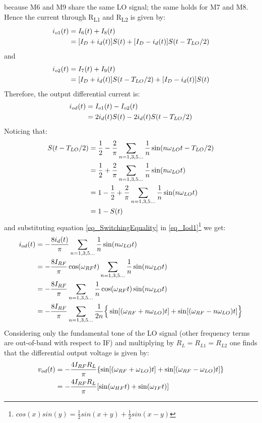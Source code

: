 because M6 and M9 share the same LO signal; the same holds for M7 and M8. 
Hence the current through R\textsubscript{L1} and R\textsubscript{L2} is given by:
\begin{align}
i_{o1}(t) &= I_6(t)+I_8(t) \notag \\
&=[I_D + i_d(t)]S(t)+[I_D - i_d(t)]S(t-T_{LO}/2) 
\end{align}
and 
\begin{align}
i_{o2}(t) &= I_7(t)+I_9(t) \notag \\
&=[I_D + i_d(t)]S(t-T_{LO}/2)+[I_D - i_d(t)]S(t) 
\end{align}
Therefore, the output differential current is:
\begin{align}
\label{eq_Iod1}
i_{od}(t) &= I_{o1}(t)-I_{o2}(t) \notag \\
&=2i_d(t) S(t)-2i_d(t)S(t-T_{LO}/2) 
\end{align}
Noticing that:
\begin{align}
\label{eq_SwitchingEquality}
S(t-T_{LO}/2) &=\frac{1}{2}-\frac{2}{\pi} \sum_{n=1,3,5 \dots}^{} \frac{1}{n}\sin(n\omega_{LO} t-T_{LO}/2) \notag \\
&= \frac{1}{2}+\frac{2}{\pi} \sum_{n=1,3,5 \dots}^{} \frac{1}{n}\sin(n\omega_{LO} t) \notag \\
& =1- \frac{1}{2}+\frac{2}{\pi} \sum_{n=1,3,5 \dots}^{} \frac{1}{n}\sin(n\omega_{LO} t) \notag \\
&= 1 - S(t)
\end{align}
and substituting equation \ref{eq_SwitchingEquality} in \ref{eq_Iod1}\footnote{$cos(x)sin(y)=\frac{1}{2}sin(x+y)+\frac{1}{2}sin(x-y)$} we get:
\begin{align}
\label{eq_Iod2}
i_{od}(t) &= -\frac{8i_d(t)}{\pi}\sum_{n=1,3,5 \dots}^{} \frac{1}{n}\sin(n\omega_{LO} t) \notag \\
&= -\frac{8I_{RF}}{\pi}\cos(\omega_{RF}t)\sum_{n=1,3,5 \dots}^{} \frac{1}{n}\sin(n\omega_{LO} t) \notag \\
&= -\frac{8I_{RF}}{\pi}\sum_{n=1,3,5 \dots}^{} \frac{1}{n}\cos(\omega_{RF}t)\sin(n\omega_{LO} t) \notag \\
&= -\frac{8I_{RF}}{\pi}\sum_{n=1,3,5 \dots}^{} \frac{1}{2n}\Big\{ \sin[(\omega_{RF}+n\omega_{LO})t]+\sin[(\omega_{RF}-n\omega_{LO}) t]\Big\}
\end{align}
Considering only the fundamental tone of the LO signal (other frequency terms are out-of-band with respect to IF) and multiplying by $R_L=R_{L1}=R_{L2}$ one finds that the differential output voltage is given by:
\begin{align}
v_{od}(t)& = -\frac{4I_{RF}R_L}{\pi}\{\sin[(\omega_{RF}+\omega_{LO}) t]+\sin[(\omega_{RF}-\omega_{LO}) t]\} \notag \\
& = -\frac{4I_{RF}R_L}{\pi}[\sin(\omega_{HF} t)+\sin(\omega_{IF} t)]
\end{align}

